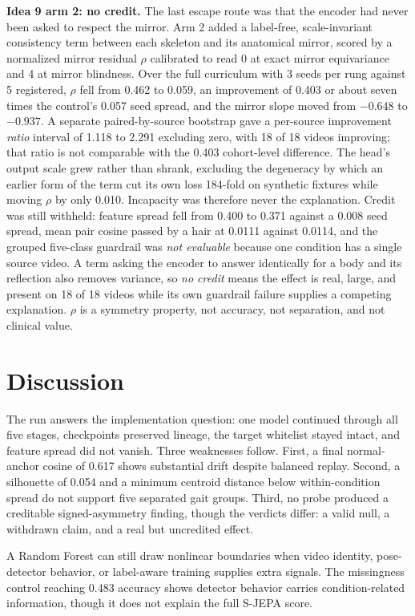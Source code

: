 \documentclass[conference]{IEEEtran}
\begin{document}
\textbf{Idea 9 arm 2: no credit.} The last escape route was that the encoder had never been asked to respect the mirror. Arm 2 added a label-free, scale-invariant consistency term between each skeleton and its anatomical mirror, scored by a normalized mirror residual $\rho$ calibrated to read 0 at exact mirror equivariance and 4 at mirror blindness. Over the full curriculum with 3 seeds per rung against 5 registered, $\rho$ fell from 0.462 to 0.059, an improvement of 0.403 or about seven times the control's 0.057 seed spread, and the mirror slope moved from $-0.648$ to $-0.937$. A separate paired-by-source bootstrap gave a per-source improvement \emph{ratio} interval of 1.118 to 2.291 excluding zero, with 18 of 18 videos improving; that ratio is not comparable with the 0.403 cohort-level difference. The head's output scale grew rather than shrank, excluding the degeneracy by which an earlier form of the term cut its own loss 184-fold on synthetic fixtures while moving $\rho$ by only 0.010. Incapacity was therefore never the explanation. Credit was still withheld: feature spread fell from 0.400 to 0.371 against a 0.008 seed spread, mean pair cosine passed by a hair at 0.0111 against 0.0114, and the grouped five-class guardrail was \emph{not evaluable} because one condition has a single source video. A term asking the encoder to answer identically for a body and its reflection also removes variance, so \emph{no credit} means the effect is real, large, and present on 18 of 18 videos while its own guardrail failure supplies a competing explanation. $\rho$ is a symmetry property, not accuracy, not separation, and not clinical value.

\section{Discussion}
The run answers the implementation question: one model continued through all five stages, checkpoints preserved lineage, the target whitelist stayed intact, and feature spread did not vanish. Three weaknesses follow. First, a final normal-anchor cosine of 0.617 shows substantial drift despite balanced replay. Second, a silhouette of 0.054 and a minimum centroid distance below within-condition spread do not support five separated gait groups. Third, no probe produced a creditable signed-asymmetry finding, though the verdicts differ: a valid null, a withdrawn claim, and a real but uncredited effect.

A Random Forest can still draw nonlinear boundaries when video identity, pose-detector behavior, or label-aware training supplies extra signals. The missingness control reaching 0.483 accuracy shows detector behavior carries condition-related information, though it does not explain the full S-JEPA score.
\end{document}
